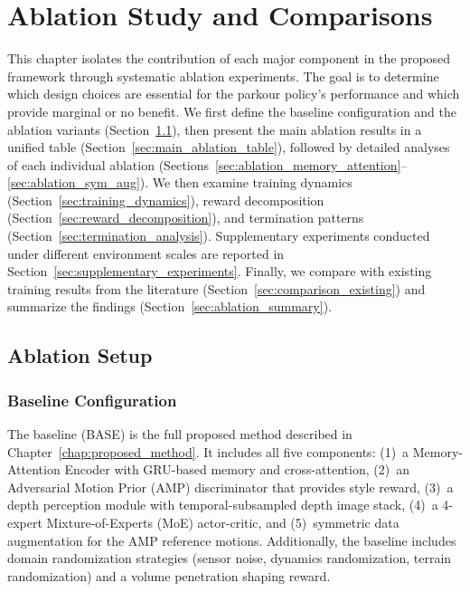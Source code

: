 \chapter{Ablation Study and Comparisons}
\label{chap:ablation}

This chapter isolates the contribution of each major component in the proposed framework through systematic ablation experiments. The goal is to determine which design choices are essential for the parkour policy's performance and which provide marginal or no benefit. We first define the baseline configuration and the ablation variants (Section~\ref{sec:ablation_setup}), then present the main ablation results in a unified table (Section~\ref{sec:main_ablation_table}), followed by detailed analyses of each individual ablation (Sections~\ref{sec:ablation_memory_attention}--\ref{sec:ablation_sym_aug}). We then examine training dynamics (Section~\ref{sec:training_dynamics}), reward decomposition (Section~\ref{sec:reward_decomposition}), and termination patterns (Section~\ref{sec:termination_analysis}). Supplementary experiments conducted under different environment scales are reported in Section~\ref{sec:supplementary_experiments}. Finally, we compare with existing training results from the literature (Section~\ref{sec:comparison_existing}) and summarize the findings (Section~\ref{sec:ablation_summary}).

\section{Ablation Setup}
\label{sec:ablation_setup}

\subsection{Baseline Configuration}
\label{sec:baseline_config}

The baseline (BASE) is the full proposed method described in Chapter~\ref{chap:proposed_method}. It includes all five components: (1)~a Memory-Attention Encoder with GRU-based memory and cross-attention, (2)~an Adversarial Motion Prior (AMP) discriminator that provides style reward, (3)~a depth perception module with temporal-subsampled depth image stack, (4)~a 4-expert Mixture-of-Experts (MoE) actor-critic, and (5)~symmetric data augmentation for the AMP reference motions. Additionally, the baseline includes domain randomization strategies (sensor noise, dynamics randomization, terrain randomization) and a volume penetration shaping reward.

